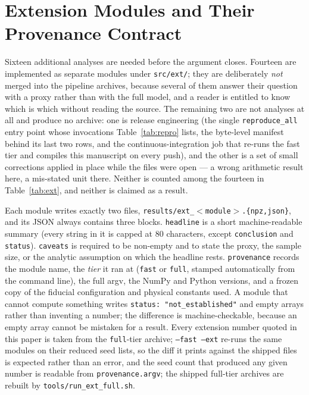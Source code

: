 \documentclass[twocolumn,10pt]{article}
\begin{document}
\section{Extension Modules and Their Provenance Contract}
\label{app:ext}

Sixteen additional analyses are needed before the argument closes. Fourteen
are implemented as separate modules under {\tt src/ext/}; they are deliberately
\emph{not} merged into the pipeline archives, because several of them answer
their question with a proxy rather than with the full model, and a reader is
entitled to know which is which without reading the source.  The remaining two
are not analyses at all and produce no archive: one is release engineering (the
single {\tt reproduce\_all} entry point whose invocations Table~\ref{tab:repro}
lists, the byte-level manifest behind its last two rows, and the
continuous-integration job that re-runs the fast tier and compiles this
manuscript on every push), and the other is a set of small corrections applied
in place while the files were open --- a wrong arithmetic result here, a
mis-stated unit there.  Neither is counted among the fourteen in
Table~\ref{tab:ext}, and neither is claimed as a result.

Each module writes exactly two files, {\tt results/ext\_$<$module$>$.\{npz,json\}},
and its JSON always contains three blocks. {\tt headline} is a short
machine-readable summary (every string in it is capped at 80 characters, except
{\tt conclusion} and {\tt status}). {\tt caveats} is required to be non-empty and
to state the proxy, the sample size, or the analytic assumption on which the
headline rests. {\tt provenance} records the module name, the \emph{tier} it ran
at ({\tt fast} or {\tt full}, stamped automatically from the command line), the
full argv, the NumPy and Python versions, and a frozen copy of the fiducial
configuration and physical constants used. A module that cannot compute
something writes {\tt status: "not\_established"} and empty arrays rather than
inventing a number; the difference is machine-checkable, because an empty array
cannot be mistaken for a result. Every extension number quoted in this paper is
taken from the {\tt full}-tier archive; {\tt --fast --ext} re-runs the same
modules on their reduced seed lists, so the diff it prints against the shipped
files is expected rather than an error, and the seed count that produced any
given number is readable from {\tt provenance.argv}; the shipped full-tier
archives are rebuilt by {\tt tools/run\_ext\_full.sh}.
\end{document}
